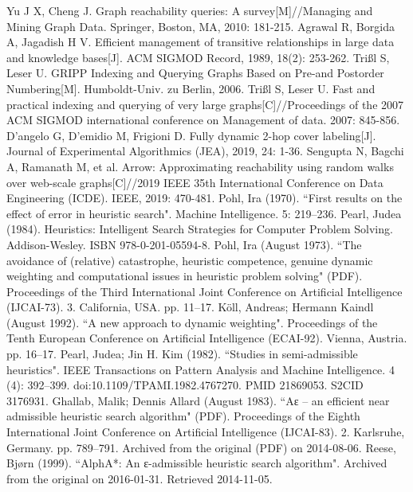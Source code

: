 \documentclass[11pt]{article}
\begin{document}
\begin{thebibliography}{References}
	 Yu J X, Cheng J. Graph reachability queries: A survey[M]//Managing and Mining Graph Data. Springer, Boston, MA, 2010: 181-215.
	 Agrawal R, Borgida A, Jagadish H V. Efficient management of transitive relationships in large data and knowledge bases[J]. ACM SIGMOD Record, 1989, 18(2): 253-262.
	 Trißl S, Leser U. GRIPP Indexing and Querying Graphs Based on Pre-and Postorder Numbering[M]. Humboldt-Univ. zu Berlin, 2006.
	 Trißl S, Leser U. Fast and practical indexing and querying of very large graphs[C]//Proceedings of the 2007 ACM SIGMOD international conference on Management of data. 2007: 845-856.
	 D'angelo G, D'emidio M, Frigioni D. Fully dynamic 2-hop cover labeling[J]. Journal of Experimental Algorithmics (JEA), 2019, 24: 1-36.
	 Sengupta N, Bagchi A, Ramanath M, et al. Arrow: Approximating reachability using random walks over web-scale graphs[C]//2019 IEEE 35th International Conference on Data Engineering (ICDE). IEEE, 2019: 470-481.
	 Pohl, Ira (1970). ``First results on the effect of error in heuristic search". Machine Intelligence. 5: 219–236.
	 Pearl, Judea (1984). Heuristics: Intelligent Search Strategies for Computer Problem Solving. Addison-Wesley. ISBN 978-0-201-05594-8.
	 Pohl, Ira (August 1973). ``The avoidance of (relative) catastrophe, heuristic competence, genuine dynamic weighting and computational issues in heuristic problem solving" (PDF). Proceedings of the Third International Joint Conference on Artificial Intelligence (IJCAI-73). 3. California, USA. pp. 11–17.
	 Köll, Andreas; Hermann Kaindl (August 1992). ``A new approach to dynamic weighting". Proceedings of the Tenth European Conference on Artificial Intelligence (ECAI-92). Vienna, Austria. pp. 16–17.
	 Pearl, Judea; Jin H. Kim (1982). ``Studies in semi-admissible heuristics". IEEE Transactions on Pattern Analysis and Machine Intelligence. 4 (4): 392–399. doi:10.1109/TPAMI.1982.4767270. PMID 21869053. S2CID 3176931.
	 Ghallab, Malik; Dennis Allard (August 1983). ``Aε – an efficient near admissible heuristic search algorithm" (PDF). Proceedings of the Eighth International Joint Conference on Artificial Intelligence (IJCAI-83). 2. Karlsruhe, Germany. pp. 789–791. Archived from the original (PDF) on 2014-08-06.
	 Reese, Bjørn (1999). ``AlphA*: An ε-admissible heuristic search algorithm". Archived from the original on 2016-01-31. Retrieved 2014-11-05.
\end{thebibliography} 
\end{document}

